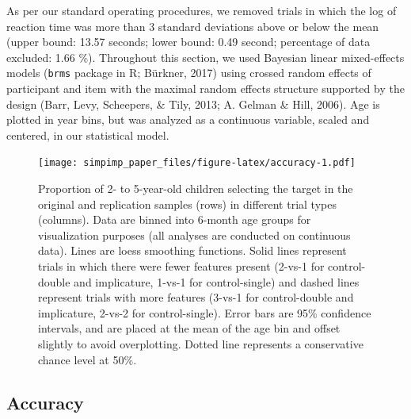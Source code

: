 \documentclass[mask,man]{apa6}
\begin{document}
As per our standard operating procedures, we removed trials in which the
log of reaction time was more than 3 standard deviations above or below
the mean (upper bound: 13.57 seconds; lower bound: 0.49 second;
percentage of data excluded: 1.66 \%). Throughout this section, we used
Bayesian linear mixed-effects models (\texttt{brms} package in R;
Bürkner, 2017) using crossed random effects of participant and item with
the maximal random effects structure supported by the design (Barr,
Levy, Scheepers, \& Tily, 2013; A. Gelman \& Hill, 2006). Age is plotted
in year bins, but was analyzed as a continuous variable, scaled and
centered, in our statistical model.

\begin{figure}
\centering
\texttt{[image: simpimp\_paper\_files/figure-latex/accuracy-1.pdf]}
\caption{\label{fig:accuracy}Proportion of 2- to 5-year-old children
selecting the target in the original and replication samples (rows) in
different trial types (columns). Data are binned into 6-month age groups
for visualization purposes (all analyses are conducted on continuous
data). Lines are loess smoothing functions. Solid lines represent trials
in which there were fewer features present (2-vs-1 for control-double
and implicature, 1-vs-1 for control-single) and dashed lines represent
trials with more features (3-vs-1 for control-double and implicature,
2-vs-2 for control-single). Error bars are 95\% confidence intervals,
and are placed at the mean of the age bin and offset slightly to avoid
overplotting. Dotted line represents a conservative chance level at
50\%.}
\end{figure}

\subsection{Accuracy}\label{accuracy}
\end{document}
